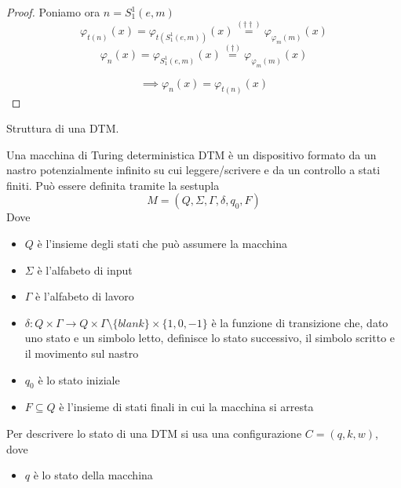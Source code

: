 \documentclass[12pt, answers]{exam}
\theoremstyle{plain}
\begin{document}
\begin{questions}
\begin{solution}
\begin{proof}
                Poniamo ora $n = S^1_1 (e, m)$
                $$ \varphi_{t(n)} (x) = \varphi_{t \left(S_1^1 (e, m)\right)} (x) \stackrel{(\dag \dag)}{=} \varphi_{\varphi_m (m)} (x) $$
                $$ \varphi_n (x) = \varphi_{S^1_1 (e, m)} (x) \stackrel{(\dag)}{=} \varphi_{\varphi_m (m)} (x) $$
                
                $$ \implies \varphi_n (x) = \varphi_{t(n)} (x) $$
            \end{proof}
        \end{solution}
        
        \question Struttura di una DTM.
        
        \begin{solution}
            Una macchina di Turing deterministica DTM è un dispositivo formato da un nastro potenzialmente infinito su cui leggere/scrivere e da un controllo a stati finiti. Può essere definita tramite la sestupla
            $$ M = \left(Q, \Sigma, \Gamma, \delta, q_0, F \right) $$
            Dove 
            \begin{itemize}
                \item $Q$ è l'insieme degli stati che può assumere la macchina
                
                \item $\Sigma$ è l'alfabeto di input
                
                \item $\Gamma$ è l'alfabeto di lavoro
                
                \item $\delta: Q \times \Gamma \rightarrow Q \times \Gamma \setminus \{blank\} \times \{1, 0, -1 \}$ è la funzione di transizione che, dato uno stato e un simbolo letto, definisce lo stato successivo, il simbolo scritto e il movimento sul nastro
                
                \item $q_0$ è lo stato iniziale
                
                \item $F \subseteq Q$ è l'insieme di stati finali in cui la macchina si arresta
            \end{itemize}
            
            Per descrivere lo stato di una DTM si usa una configurazione $C = (q, k, w)$, dove
            \begin{itemize}
                \item $q$ è lo stato della macchina
                

\end{itemize}
\end{solution}
\end{questions}
\end{document}
